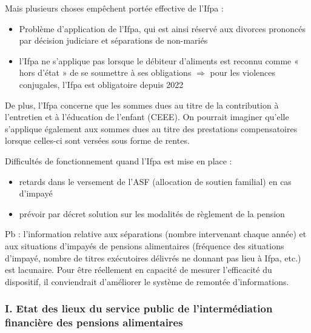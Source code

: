 \documentclass{article}
\begin{document}
\medskip
\noindent Mais plusieurs choses empêchent portée effective de l'Ifpa :
\begin{itemize}
    \item Problème d'application de l'Ifpa, qui est ainsi réservé aux divorces prononcés par décision judiciare et séparations de non-mariés
    \item l'Ifpa ne s'applique pas lorsque le débiteur d'aliments est reconnu comme « hors d'état » de se soumettre à ses obligations $\Rightarrow$ pour les violences conjugales, l'Ifpa est obligatoire depuis 2022
\end{itemize}
 
\medskip
\noindent De plus, l'Ifpa concerne que les sommes dues au titre de la contribution à l'entretien et à l'éducation de l'enfant (CEEE). On pourrait imaginer qu'elle s'applique également aux sommes dues au titre des prestations compensatoires lorsque celles-ci sont versées sous forme de rentes.
 
\medskip
\noindent Difficultés de fonctionnement quand l'Ifpa est mise en place :
\begin{itemize}
    \item retards dans le versement de l'ASF (allocation de soutien familial) en cas d'impayé
    \item prévoir par décret solution sur les modalités de règlement de la pension
\end{itemize}
 
\medskip
\noindent Pb : l'information relative aux séparations (nombre intervenant chaque année) et aux situations d'impayés de pensions alimentaires (fréquence des situations d'impayé, nombre de titres exécutoires délivrés ne donnant pas lieu à Ifpa, etc.) est lacunaire. Pour être réellement en capacité de mesurer l'efficacité du dispositif, il conviendrait d'améliorer le système de remontée d'informations.
 
 
\subsubsection*{I. Etat des lieux du service public de l'intermédiation financière des pensions alimentaires}
 
\end{document}
